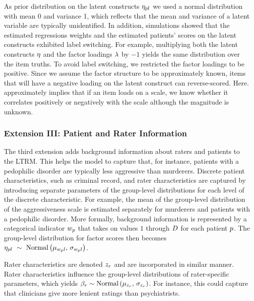 \documentclass[a4paper,usenames,dvipsnames]{article}
\begin{document}
As prior distribution on the latent constructs $\eta_{pl}$ we used a normal distribution with mean 0 and variance 1, which reflects that the mean and variance of a latent variable are typically  unidentified. In addition, simulations showed that the estimated regressions weights and the estimated patients' scores on the latent constructs exhibited label switching. For example, multiplying both the latent constructs $\eta$ and the factor loadings $\lambda$ by $-1$ yields the same distribution over the item truths. To avoid label switching, we restricted the factor loadings to be positive. Since we assume the factor structure to be approximately known, items that will have a negative loading on the latent construct can reverse-scored. Here. approximately implies that if an item loads on a scale, we know whether it correlates positively or negatively with the scale although the magnitude is unknown.

\subsubsection*{Extension III: Patient and Rater Information}
The third extension adds background information about raters and patients to the LTRM. This helps the model to capture that, for instance, patients with a pedophilic disorder are typically less aggressive than murderers. Discrete patient characteristics, such as criminal record,  and rater characteristics are captured by introducing separate parameters of the group-level distributions for each level of the discrete characteristic. For example, the mean of the group-level distribution of the aggressiveness scale is estimated separately for murderers and patients with a pedophilic disorder. More formally, background information is represented by a categorical indicator $w_{p}$ that takes on values $1$ through $\TdiscreteP$ for each patient $p$. The group-level distribution for factor scores then becomes $\eta_{pl}~\sim~\text{Normal}\left(\mu_{w_pl},\,\sigma_{w_pl}\right)$.

 Rater characteristics are denoted $z_r$ and are incorporated in similar manner. Rater characteristics influence the group-level distributions of rater-specific parameters, which yields $\beta_r \sim \text{Normal}\left(\mu_{z_r},\,\sigma_{z_r}\right)$. For instance, this could capture that clinicians give more lenient ratings than psychiatrists.
\end{document}
